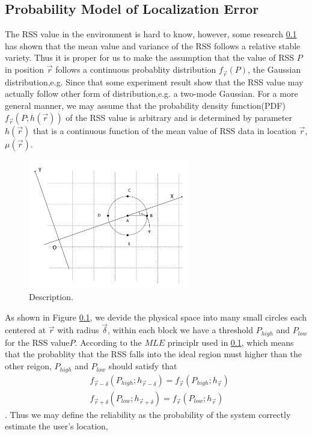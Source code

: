 \documentclass[10pt,conference,compsocconf,letterpaper]{IEEEtran}
\begin{document}
\subsection{Probability Model of Localization Error}
The RSS value in the environment is hard to know, however, some research \ref{} has shown that the mean value and variance of the RSS follows a relative stable variety. Thus it is proper for us to make the assumption that the value of RSS $P$ in position $\vec r$ follows a continuous probablity distribution $f_{\vec r}(P)$, the Gaussian distribution,e.g. Since that some experiment result show that the RSS value may actually follow other form of distribution,e.g. a two-mode Gaussian. For a more general manner, we may assume that the probability density function(PDF)$f_{\vec r}(P;h(\vec r))$ of the RSS value is arbitrary and is determined by parameter $h(\vec r)$ that is a continuous function of the mean value of RSS data in location $\vec r$, $\mu(\vec r)$. 
\begin{figure}[!htbp]
\centering
\includegraphics [width = 7cm]{Figure4.pdf}
\caption{Description.}
\label{fig:4}
\end{figure}
As shown in Figure \ref{},  we devide the physical space into many small circles each centered at $\vec r$ with radius $\vec \delta$, within each block we have a threshold  $P_{high}$ and $P_{low}$ for the RSS value$P$.  According to the $MLE$ principlr used in \ref{}, which means that the probablity that the RSS falls into the ideal region must higher than the other reigon, $P_{high}$ and $P_{low}$ should satisfy that 
\begin{equation}
\begin{aligned}
&f_{\vec r-\delta}(P_{high};h_{\vec r-\delta})=f_{\vec r}(P_{high};h_{\vec r})\\
&f_{\vec r+\delta}(P_{low};h_{\vec r+\delta})=f_{\vec r}(P_{low};h_{\vec r}) 
\end{aligned}
\end{equation}
. Thus we may define the reliability as the probability of the system correctly estimate the user's location,  
\end{document}
